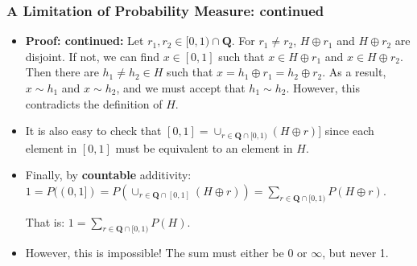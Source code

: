 \documentclass[handout]{beamer}
\begin{document}
\frame
{
  \frametitle{A Limitation of Probability Measure: continued}

   \begin{itemize}

      
       \item<1->\textbf{Proof: continued:}  Let $r_1, r_2 \in [0,1) \cap \mathbf{Q}$. For $r_1\neq r_2$, $H\oplus r_1$ and $H\oplus r_2$ are disjoint. If not, we can find $x\in [0,1]$ such that $x\in H\oplus r_1$ and $x\in H\oplus r_2$. Then there are $h_1\neq  h_2 \in H$ such that $x=h_1\oplus r_1=h_2\oplus r_2$. As a result, $x\sim h_1$ and  $x\sim h_2$, and we must accept that $h_1\sim h_2$. However, this contradicts the definition of $H$. 
       
      \item<2->It is also easy to check that $[0,1]=\cup_{r \in \mathbf{Q} \cap [0,1) } (H\oplus r)]$ since each element in $[0,1]$ must be equivalent to an element in $H$. 
      
      \item<3->Finally, by {\bf countable} additivity: $1=P((0,1])=P(\cup_{r \in \mathbf{Q} \cap [0,1] } (H\oplus r) )=\sum_{r \in \mathbf{Q} \cap [0,1) } P(H\oplus r)$. 
      
      That is: $1=\sum_{r \in \mathbf{Q} \cap [0,1) } P(H)$. 
      
      \item<4-> However, this is impossible! The sum must either be $0$ or $\infty$, but never 1. 
             
  \end{itemize}
}
\end{document}
